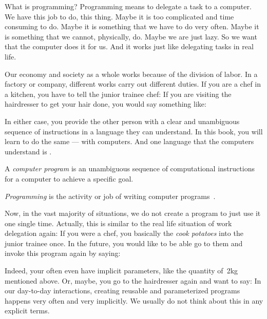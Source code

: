 %
What is programming?
Programming means to delegate a task to a computer.
We have this job to do, this thing.
Maybe it is too complicated and time consuming to do.
Maybe it is something that we have to do very often.
Maybe it is something that we cannot, physically, do.
Maybe we are just lazy.
So we want that the computer does it for us.
And it works just like delegating tasks in real life.

Our economy and society as a whole works because of the division of labor.
In a factory or company, different works carry out different duties.
If you are a chef in a kitchen, you have to tell the junior trainee chef:
If you are visiting the hairdresser to get your hair done, you would say something like:

In either case, you provide the other person with a clear and unambiguous sequence of instructions in a language they can understand.
In this book, you will learn to do the same --- with computers.
And one language that the computers understand is \python.
%
\begin{definition}%
A \emph{computer program} is an unambiguous sequence of computational instructions for a computer to achieve a specific goal.%
\end{definition}%
\begin{definition}[Programming]%
\label{def:programming}
\emph{Programming} is the activity or job of writing computer programs~\cite{CDE:PMOPIE}.%
\end{definition}%
%
Now, in the vast majority of situations, we do not create a program to just use it one single time.
Actually, this is similar to the real life situation of work delegation again:
If you were a chef, you basically  the  \emph{cook potatoes} into the junior trainee once.
In the future, you would like to be able go to them and invoke this program again by saying:

Indeed, your  often even have implicit parameters, like the quantity of~2kg mentioned above.
Or, maybe, you go to the hairdresser again and want to say: 
In our day-to-day interactions, creating reusable and parameterized programs happens very often and very implicitly.
We usually do not think about this in any explicit terms.

